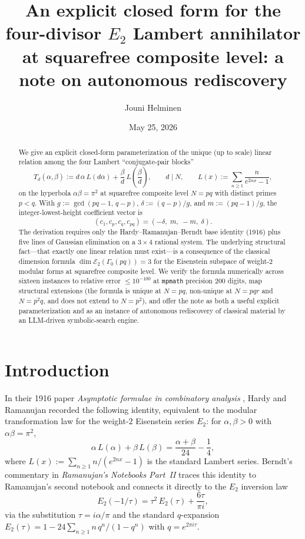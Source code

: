 \documentclass[11pt,reqno]{amsart}
\title{An explicit closed form for the four-divisor $E_2$ Lambert annihilator at
squarefree composite level: a note on autonomous rediscovery}
\author{Jouni Helminen}
\date{May 25, 2026}
\theoremstyle{definition}
\newcommand{\Eis}{\mathcal{E}}
\begin{document}
\begin{abstract}
We give an explicit closed-form parameterization of the unique
(up to scale) linear relation among the four Lambert ``conjugate-pair
blocks''
\[
T_d(\alpha,\beta) := d\,\alpha\,L(d\alpha)
+ \frac{\beta}{d}\,L\!\left(\frac{\beta}{d}\right),
\qquad d \mid N,
\qquad L(x) := \sum_{n \ge 1}\frac{n}{e^{2nx}-1},
\]
on the hyperbola $\alpha\beta = \pi^2$ at squarefree composite level
$N = pq$ with distinct primes $p < q$. With
$g := \gcd(pq-1,\, q-p)$, $\delta := (q-p)/g$, and $m := (pq-1)/g$,
the integer-lowest-height coefficient vector is
\[
(c_1, c_p, c_q, c_{pq}) = (-\delta,\; m,\; -m,\; \delta).
\]
The derivation requires only the Hardy--Ramanujan--Berndt base identity
(1916) plus five lines of Gaussian elimination on a $3\times 4$ rational
system. The underlying structural fact---that exactly one linear
relation must exist---is a consequence of the classical dimension
formula $\dim \Eis_2(\Gamma_0(pq)) = 3$ for the Eisenstein subspace of
weight-$2$ modular forms at squarefree composite level. We verify the
formula numerically across sixteen instances to relative error
$\le 10^{-100}$ at \texttt{mpmath} precision $200$ digits, map
structural extensions (the formula is unique at $N = pq$, non-unique
at $N = pqr$ and $N = p^2 q$, and does not extend to $N = p^2$), and
offer the note as both a useful explicit parameterization and as an
instance of autonomous rediscovery of classical material by an
LLM-driven symbolic-search engine.
\end{abstract}

\maketitle

\section{Introduction}\label{sec:intro}

In their 1916 paper \emph{Asymptotic formulae in combinatory analysis}
\cite[eq.~(1.55)]{HardyRamanujan1916}, Hardy and Ramanujan recorded the
following identity, equivalent to the modular transformation law for
the weight-$2$ Eisenstein series $E_2$: for $\alpha,\beta > 0$ with
$\alpha\beta = \pi^2$,
\begin{equation}\label{eq:HRB}
\alpha\, L(\alpha) + \beta\, L(\beta)
= \frac{\alpha + \beta}{24} - \frac{1}{4},
\end{equation}
where $L(x) := \sum_{n \ge 1} n/(e^{2nx} - 1)$ is the standard Lambert
series. Berndt's commentary in \emph{Ramanujan's Notebooks Part~II}
\cite[Ch.~14, Entry~27(iii)]{BerndtNB2} traces this identity to
Ramanujan's second notebook and connects it directly to the $E_2$
inversion law
\begin{equation}\label{eq:E2}
E_2(-1/\tau) = \tau^2\, E_2(\tau) + \frac{6\tau}{\pi i},
\end{equation}
via the substitution $\tau = i\alpha/\pi$ and the standard
$q$-expansion $E_2(\tau) = 1 - 24\sum_{n \ge 1} n\, q^n/(1 - q^n)$
with $q = e^{2\pi i \tau}$.
\end{document}
